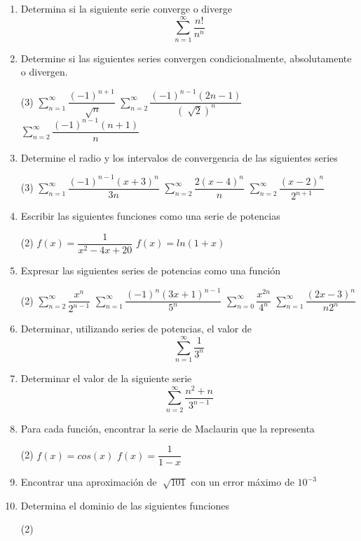 \documentclass[12pt]{article}
\newenvironment{preguntas}
{\begin{enumerate}\itemsep12pt
	}
	{
	\end{enumerate}
}
\begin{document}
\begin{preguntas}
\item Determina si la siguiente serie converge o diverge
$$\sum\limits_{n=1}^{\infty}\dfrac{n!}{n^n}$$
\item Determine si las siguientes series convergen condicionalmente, absolutamente o divergen.
\begin{tasks}(3)
\task $\sum\limits_{n=1}^{\infty}\dfrac{(-1)^{n+1}}{\sqrt[]{n}}$
\task $\sum\limits_{n=2}^{\infty}\dfrac{(-1)^{n-1}(2n-1)}{(\sqrt[]{2})^n}$
\task $\sum\limits_{n=2}^{\infty}\dfrac{(-1)^{n-1}(n+1)}{n}$
\end{tasks}
\item Determine el radio y los intervalos de convergencia de las siguientes series
\begin{tasks}(3)
\task $\sum\limits_{n=1}^{\infty}\dfrac{(-1)^{n-1}(x+3)^n}{3n}$
\task $\sum\limits_{n=2}^{\infty}\dfrac{2(x-4)^n}{n}$
\task $\sum\limits_{n=2}^{\infty}\dfrac{(x-2)^n}{2^{n+1}}$
\end{tasks}
\item Escribir las siguientes funciones como una serie de potencias
\begin{tasks}(2)
\task $f(x) = \dfrac{1}{x^2-4x+20}$
\task $f(x) = ln(1+x)$
\end{tasks}
\item Expresar las siguientes series de potencias como una función
\begin{tasks}(2)
\task $\sum\limits_{n=2}^\infty \dfrac{x^n}{2^{n-1}}$
\task $\sum\limits_{n=1}^\infty \dfrac{(-1)^n (3x+1)^{n-1}}{5^n}$
\task $\sum\limits_{n=0}^\infty \dfrac{x^{2n}}{4^n}$
\task $\sum\limits_{n=1}^\infty \dfrac{(2x-3)^n}{n2^n}$
\end{tasks}
\item Determinar, utilizando series de potencias, el valor de
	$$\sum\limits_{n=1}^\infty \frac{1}{3^n}$$
\item Determinar el valor de la siguiente serie
	$$ \sum\limits_{n=2}^{\infty}\dfrac{n^2+n}{3^{n-1}} $$
\item Para cada función, encontrar la serie de Maclaurin que la representa
\begin{tasks}(2)
\task $f(x) = cos(x)$
\task $f(x) = \dfrac{1}{1-x}$
\end{tasks}
\item Encontrar una aproximación de $\sqrt[]{101}$ con un error máximo de $10^{-3}$
\item Determina el dominio de las siguientes funciones
\begin{tasks}(2)

\end{tasks}
\end{preguntas}
\end{document}
